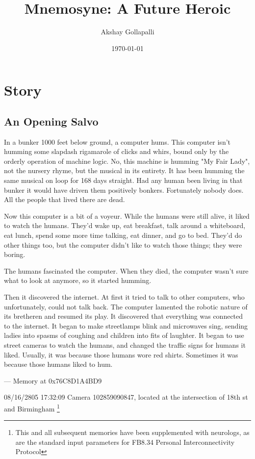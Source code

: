 \documentclass[12pt]{article}
\author{Akshay Gollapalli}
\date{\today}
\title{Mnemosyne: A Future Heroic}
\begin{document}
\maketitle


\section*{Story}
\label{sec:org65427f5}
\subsection*{An Opening Salvo}
\label{sec:orgf2c21c2}

In a bunker 1000 feet below ground, a computer hums. This computer isn't humming some slapdash rigamarole of clicks and whirs, bound only by the orderly operation of machine logic. No, this machine is humming "My Fair Lady", not the nursery rhyme, but the musical in its entirety. It has been humming the same musical on loop for 168 days straight. Had any human been living in that bunker it would have driven them positively bonkers. Fortunately nobody does. All the people that lived there are dead.

Now this computer is a bit of a voyeur. While the humans were still alive, it liked to watch the humans. They'd wake up, eat breakfast, talk around a whiteboard, eat lunch, spend some more time talking, eat dinner, and go to bed. They'd do other things too, but the computer didn't like to watch those things; they were boring.

The humans fascinated the computer. When they died, the computer wasn't sure what to look at anymore, so it started humming.

Then it discovered the internet. At first it tried to talk to other computers, who unfortunately, could not talk back. The computer lamented the robotic nature of its bretheren and resumed its play. It discovered that everything was connected to the internet. It began to make streetlamps blink and microwaves sing, sending ladies into spasms of coughing and children into fits of laughter. It began to use street cameras to watch the humans, and changed the traffic signs for humans it liked. Usually, it was because those humans wore red shirts. Sometimes it was because those humans liked to hum.

--- Memory at 0x76C8D1A4BD9

08/16/2805 17:32:09 Camera 102859090847, located at the intersection of 18th st and Birmingham \footnote{This and all subsequent memories have been supplemented with neurologs, as are the standard input parameters for FB8.34 Personal Interconnectivity Protocol}
\end{document}

